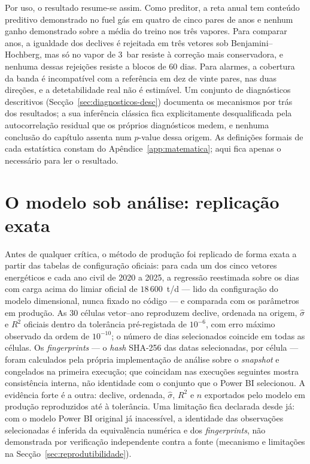 Por uso, o resultado resume-se assim. Como preditor, a reta anual tem
conteúdo preditivo demonstrado no fuel gás em quatro de cinco pares de
anos e nenhum ganho demonstrado sobre a média do treino nos três vapores.
Para comparar anos, a igualdade dos declives é rejeitada em três vetores
sob Benjamini--Hochberg, mas só no vapor de 3~bar resiste à correção mais
conservadora, e nenhuma dessas rejeições resiste a blocos de 60 dias. Para
alarmes, a cobertura da banda é incompatível com a referência em dez de
vinte pares, nas duas direções, e a detetabilidade real não é estimável. Um
conjunto de diagnósticos descritivos (Secção~\ref{sec:diagnosticos-desc})
documenta os mecanismos por trás dos resultados; a sua inferência clássica
fica explicitamente desqualificada pela autocorrelação residual que os
próprios diagnósticos medem, e nenhuma conclusão do capítulo assenta num
$p$-value dessa origem. As definições formais de cada estatística constam do
Apêndice~\ref{app:matematica}; aqui fica apenas o necessário para ler o
resultado.

\section{O modelo sob análise: replicação exata}
\label{sec:replicacao}

Antes de qualquer crítica, o método de produção foi replicado de forma exata a
partir das tabelas de configuração oficiais: para cada um dos cinco vetores
energéticos e cada ano civil de 2020 a 2025, a regressão
 reestimada sobre os dias com carga acima do limiar oficial de
$18\,600$~t/d --- lido da configuração do modelo dimensional, nunca fixado no
código --- e comparada com os parâmetros em produção. As 30 células
vetor--ano reproduzem declive, ordenada na origem, $\hat\sigma$ e $R^2$
oficiais dentro da tolerância pré-registada de
$10^{-6}$, com erro máximo
observado da ordem de $10^{-10}$; o número de dias selecionados coincide
em todas as células. Os \emph{fingerprints} --- o \emph{hash} SHA-256 das datas
selecionadas, por célula --- foram calculados pela própria implementação de
análise sobre o \emph{snapshot} e congelados na primeira execução; que
coincidam nas execuções seguintes mostra consistência interna, não
identidade com o conjunto que o Power BI selecionou. A evidência forte é a
outra: declive, ordenada, $\hat\sigma$, $R^2$ e $n$ exportados pelo modelo em
produção reproduzidos até à tolerância. Uma limitação fica declarada desde
já: com o modelo Power BI original já
inacessível, a identidade das observações selecionadas é inferida da
equivalência numérica e dos \emph{fingerprints}, não demonstrada por
verificação independente contra a fonte
(mecanismo e limitações na Secção~\ref{sec:reprodutibilidade}).

